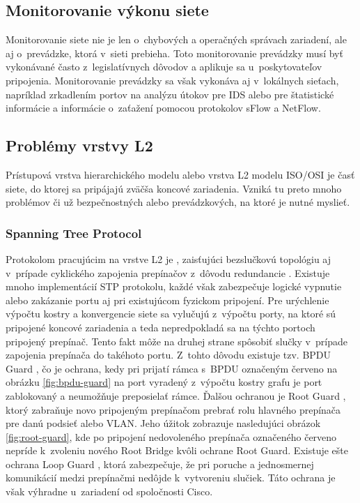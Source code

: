 \subsection{Monitorovanie výkonu siete}
Monitorovanie siete nie je len o~chybových a operačných správach zariadení, ale aj o~prevádzke, ktorá v~sieti prebieha. Toto monitorovanie prevádzky musí byť vykonávané často z~legislatívnych dôvodov a aplikuje sa u~poskytovateľov pripojenia. Monitorovanie prevádzky sa však vykonáva aj v~lokálnych sieťach, napríklad zrkadlením portov \cite{Singh2018} na analýzu útokov pre IDS alebo pre štatistické informácie a informácie o~zaťažení pomocou protokolov sFlow a NetFlow.

\subsection{Problémy vrstvy L2}
Prístupová vrstva hierarchického modelu alebo vrstva L2 modelu ISO/OSI je časť siete, do ktorej sa pripájajú zväčša koncové zariadenia. Vzniká tu preto mnoho problémov či už bezpečnostných alebo prevádzkových, na ktoré je nutné myslieť.

\subsubsection{Spanning Tree Protocol}
Protokolom pracujúcim na vrstve L2 je , zaisťujúci bezslučkovú topológiu aj v~prípade cyklického zapojenia prepínačov z~dôvodu redundancie \cite{Lammle2013}. Existuje mnoho implementácií STP protokolu, každé však zabezpečuje logické vypnutie alebo zakázanie portu aj pri existujúcom fyzickom pripojení. Pre urýchlenie výpočtu kostry a konvergencie siete sa vylučujú z~výpočtu porty, na ktoré sú pripojené koncové zariadenia a teda nepredpokladá sa na týchto portoch pripojený prepínač. Tento fakt môže na druhej strane spôsobiť slučky v~prípade zapojenia prepínača do takéhoto portu. Z~tohto dôvodu existuje tzv. BPDU Guard \cite{Lammle2013}, čo je ochrana, kedy pri prijatí rámca s~BPDU označeným červeno na obrázku  \ref{fig:bpdu-guard} na port vyradený z~výpočtu kostry grafu je port zablokovaný a neumožňuje preposielať rámce. Ďalšou ochranou je Root Guard \cite{Vyncke2008}, ktorý zabraňuje novo pripojeným prepínačom prebrať rolu hlavného prepínača pre danú podsieť alebo VLAN. Jeho úžitok zobrazuje nasledujúci obrázok \ref{fig:root-guard}, kde po pripojení nedovoleného prepínača označeného červeno nepríde k~zvoleniu nového Root Bridge kvôli ochrane Root Guard. Existuje ešte ochrana Loop Guard \cite{Vyncke2008}, ktorá zabezpečuje, že pri poruche a jednosmernej komunikácií medzi prepínačmi nedôjde k~vytvoreniu slučiek. Táto ochrana je však výhradne u~zariadení od spoločnosti Cisco. 

